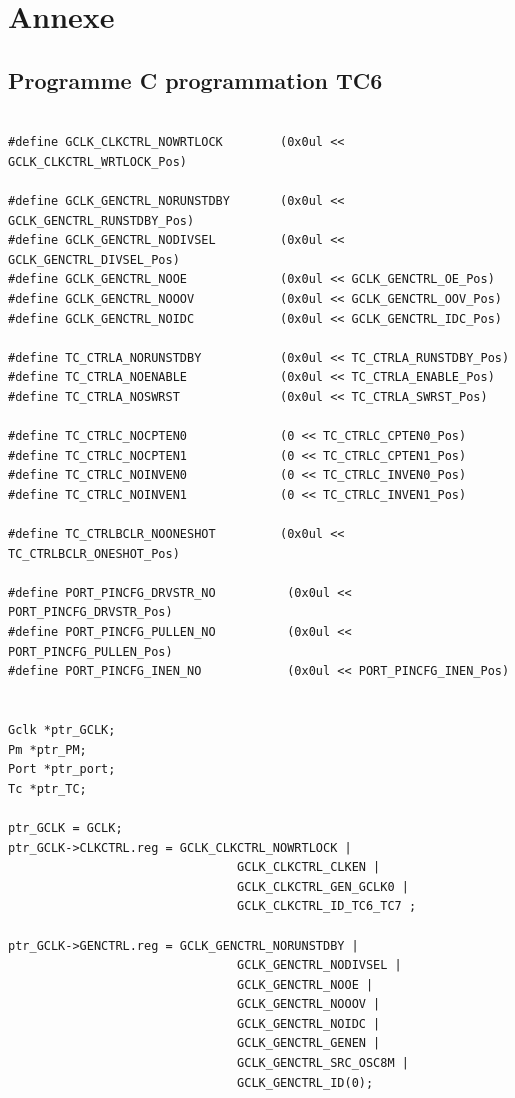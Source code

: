 \documentclass[a4paper]{article}
\begin{document}
  \newpage
  
	{}
	
	
	\newpage
	
	\section{Annexe}
	
	\subsection{Programme C programmation TC6}
\begin{lstlisting}[style=CStyle]

#define GCLK_CLKCTRL_NOWRTLOCK        (0x0ul << GCLK_CLKCTRL_WRTLOCK_Pos)

#define GCLK_GENCTRL_NORUNSTDBY       (0x0ul << GCLK_GENCTRL_RUNSTDBY_Pos)
#define GCLK_GENCTRL_NODIVSEL         (0x0ul << GCLK_GENCTRL_DIVSEL_Pos)
#define GCLK_GENCTRL_NOOE             (0x0ul << GCLK_GENCTRL_OE_Pos)
#define GCLK_GENCTRL_NOOOV            (0x0ul << GCLK_GENCTRL_OOV_Pos)
#define GCLK_GENCTRL_NOIDC            (0x0ul << GCLK_GENCTRL_IDC_Pos)

#define TC_CTRLA_NORUNSTDBY           (0x0ul << TC_CTRLA_RUNSTDBY_Pos)
#define TC_CTRLA_NOENABLE             (0x0ul << TC_CTRLA_ENABLE_Pos)
#define TC_CTRLA_NOSWRST              (0x0ul << TC_CTRLA_SWRST_Pos)

#define TC_CTRLC_NOCPTEN0             (0 << TC_CTRLC_CPTEN0_Pos)
#define TC_CTRLC_NOCPTEN1             (0 << TC_CTRLC_CPTEN1_Pos)
#define TC_CTRLC_NOINVEN0             (0 << TC_CTRLC_INVEN0_Pos)
#define TC_CTRLC_NOINVEN1             (0 << TC_CTRLC_INVEN1_Pos)

#define TC_CTRLBCLR_NOONESHOT         (0x0ul << TC_CTRLBCLR_ONESHOT_Pos)

#define PORT_PINCFG_DRVSTR_NO          (0x0ul << PORT_PINCFG_DRVSTR_Pos)
#define PORT_PINCFG_PULLEN_NO          (0x0ul << PORT_PINCFG_PULLEN_Pos)
#define PORT_PINCFG_INEN_NO            (0x0ul << PORT_PINCFG_INEN_Pos)


Gclk *ptr_GCLK;
Pm *ptr_PM;
Port *ptr_port;
Tc *ptr_TC;

ptr_GCLK = GCLK;
ptr_GCLK->CLKCTRL.reg = GCLK_CLKCTRL_NOWRTLOCK |
								GCLK_CLKCTRL_CLKEN |
								GCLK_CLKCTRL_GEN_GCLK0 |
								GCLK_CLKCTRL_ID_TC6_TC7 ;

ptr_GCLK->GENCTRL.reg = GCLK_GENCTRL_NORUNSTDBY |
								GCLK_GENCTRL_NODIVSEL |
								GCLK_GENCTRL_NOOE |
								GCLK_GENCTRL_NOOOV |
								GCLK_GENCTRL_NOIDC |
								GCLK_GENCTRL_GENEN |
								GCLK_GENCTRL_SRC_OSC8M |
								GCLK_GENCTRL_ID(0);
									

\end{lstlisting}
\end{document}
